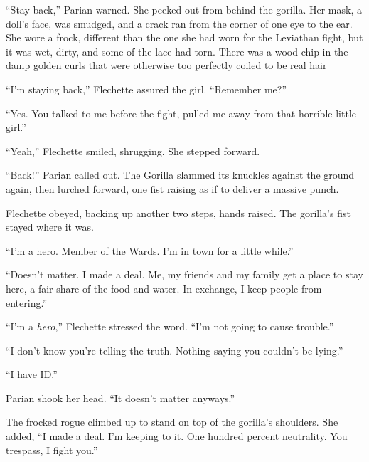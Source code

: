 ``Stay back,'' Parian warned.  She peeked out from behind the gorilla.  Her mask, a doll's face, was smudged, and a crack ran from the corner of one eye to the ear.  She wore a frock, different than the one she had worn for the Leviathan fight, but it was wet, dirty, and some of the lace had torn.  There was a wood chip in the damp golden curls that were otherwise too perfectly coiled to be real hair



``I'm staying back,'' Flechette assured the girl.  ``Remember me?''



``Yes.  You talked to me before the fight, pulled me away from that horrible little girl.''



``Yeah,'' Flechette smiled, shrugging.  She stepped forward.



``Back!''  Parian called out.  The Gorilla slammed its knuckles against the ground again, then lurched forward, one fist raising as if to deliver a massive punch.



Flechette obeyed, backing up another two steps, hands raised.  The gorilla's fist stayed where it was.



``I'm a hero.  Member of the Wards.  I'm in town for a little while.''



``Doesn't matter.  I made a deal.  Me, my friends and my family get a place to stay here, a fair share of the food and water.  In exchange, I keep people from entering.''



``I'm a \emph{hero},'' Flechette stressed the word.  ``I'm not going to cause trouble.''



``I don't know you're telling the truth.  Nothing saying you couldn't be lying.''



``I have ID.''



Parian shook her head.  ``It doesn't matter anyways.''



The frocked rogue climbed up to stand on top of the gorilla's shoulders.  She added, ``I made a deal.  I'm keeping to it.  One hundred percent neutrality.  You trespass, I fight you.''



